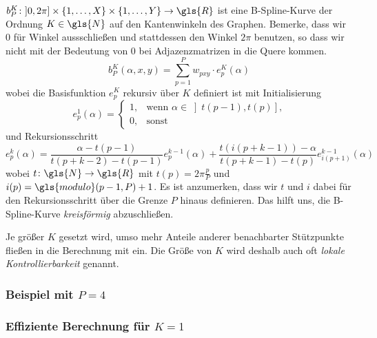 $b_P^K \colon \left]0, 2\pi\right] \times \left\{1, \ldots, X \right\} \times \left\{1, \ldots, Y\right\} \to \gls{R}$ ist eine B-Spline-Kurve der Ordnung $K \in \gls{N}$ auf den Kantenwinkeln des Graphen.
Bemerke, dass wir $0$ für Winkel aussschließen und stattdessen den Winkel $2\pi$ benutzen, so dass wir nicht mit der Bedeutung von $0$ bei Adjazenzmatrizen in die Quere kommen.
\begin{equation}
  b_P^K\left(\alpha, x, y \right) = \sum_{p=1}^P w_{pxy} \cdot e_p^K\left(\alpha\right)
\end{equation}
wobei die Basisfunktion $e_p^K$ rekursiv über $K$ definiert ist mit Initialisierung
\begin{equation}
  e_p^1\left(\alpha\right) = \begin{cases}
    1, & \text{wenn }\alpha \in \left] t\left(p-1\right), t\left(p\right)\right]\text{,}\\
    0, & \text{sonst}
  \end{cases}
\end{equation}
und Rekursionsschritt
\begin{equation}
  e_p^k\left(\alpha\right) = \frac{\alpha - t\left(p - 1\right)}{t\left(p+k-2\right) - t\left(p - 1\right)} e_p^{k-1}\left(\alpha\right) + \frac{t\left(i\left(p + k - 1\right)\right) - \alpha}{t\left(p+k - 1\right) - t\left(p\right)} e_{i\left(p+1\right)}^{k-1}\left(\alpha\right)
\end{equation}
wobei $t \colon \gls{N} \to \gls{R}$ mit $t\left(p\right) = 2\pi\frac{p}{P}$ und $i\left(p\right) = \gls{modulo}\left(p-1, P\right) + 1$.
Es ist anzumerken, dass wir $t$ und $i$ dabei für den Rekursionsschritt über die Grenze $P$ hinaus definieren.
Das hilft uns, die B-Spline-Kurve \emph{kreisförmig} abzuschließen.

Je größer $K$ gesetzt wird, umso mehr Anteile anderer benachbarter Stützpunkte fließen in die Berechnung mit ein.
Die Größe von $K$ wird deshalb auch oft \emph{lokale Kontrollierbarkeit} genannt.

\subsubsection{Beispiel mit $P=4$}



\subsubsection{Effiziente Berechnung für $K=1$}

